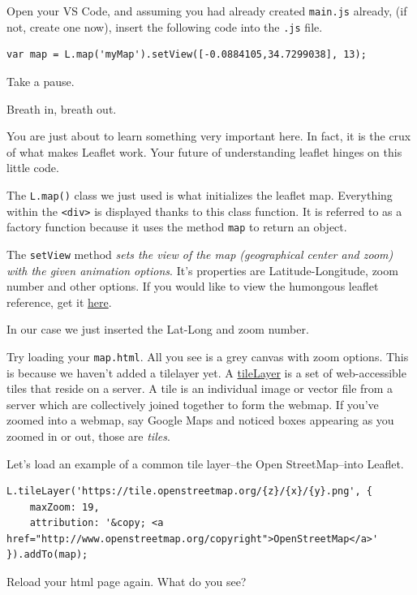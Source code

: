 \documentclass[
]{book}
\begin{document}
Open your VS Code, and assuming you had already created \texttt{main.js} already, (if not, create one now), insert the following code into the \texttt{.js} file.

\begin{verbatim}
var map = L.map('myMap').setView([-0.0884105,34.7299038], 13);
\end{verbatim}

Take a pause.

Breath in, breath out.

You are just about to learn something very important here. In fact, it is the crux of what makes Leaflet work. Your future of understanding leaflet hinges on this little code.

The \texttt{L.map()} class we just used is what initializes the leaflet map. Everything within the \texttt{\textless{}div\textgreater{}} is displayed thanks to this class function. It is referred to as a factory function because it uses the method \texttt{map} to return an object.

The \texttt{setView} method \emph{sets the view of the map (geographical center and zoom) with the given animation options}. It's properties are Latitude-Longitude, zoom number and other options. If you would like to view the humongous leaflet reference, get it \href{https://leafletjs.com/reference.html}{here}.

In our case we just inserted the Lat-Long and zoom number.

Try loading your \texttt{map.html}. All you see is a grey canvas with zoom options. This is because we haven't added a tilelayer yet. A \href{https://pro.arcgis.com/en/pro-app/latest/help/data/services/use-tiled-web-layers.htm}{tileLayer} is a set of web-accessible tiles that reside on a server. A tile is an individual image or vector file from a server which are collectively joined together to form the webmap. If you've zoomed into a webmap, say Google Maps and noticed boxes appearing as you zoomed in or out, those are \emph{tiles}.

Let's load an example of a common tile layer--the Open StreetMap--into Leaflet.

\begin{verbatim}
L.tileLayer('https://tile.openstreetmap.org/{z}/{x}/{y}.png', {
    maxZoom: 19,
    attribution: '&copy; <a href="http://www.openstreetmap.org/copyright">OpenStreetMap</a>'
}).addTo(map);
\end{verbatim}

Reload your html page again. What do you see?
\end{document}

